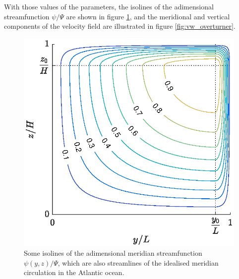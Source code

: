 With those values of the parameters, the isolines of the adimensional streamfunction $\psi/\Psi$ are shown in figure \ref{fig:psi_overturner}, and the meridional and vertical components of the velocity field are illustrated in figure \ref{fig:vw_overturner}.
\begin{figure}[ht]
	\centering
	\includegraphics[width=.6\textwidth]{fig/overturner/psi.eps}
	\caption{Some isolines of the adimensional meridian streamfunction $\psi(y,z)/\Psi$, which are also streamlines of the idealised meridian circulation in the Atlantic ocean.}
	\label{fig:psi_overturner}
\end{figure}

